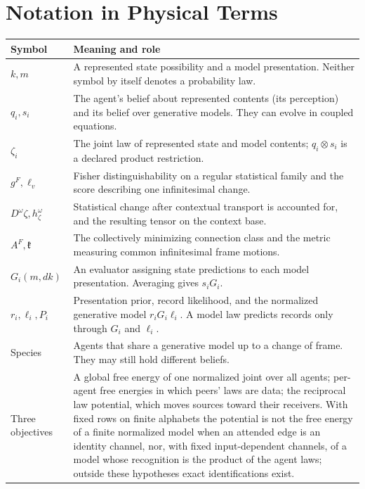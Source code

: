 \chapter{Notation in Physical Terms}
\begingroup
\small{}
\renewcommand{\arraystretch}{1.0}
\begin{longtable}{@{}>{\raggedright\arraybackslash}p{}>{\raggedright\arraybackslash}p{}@{}}
\toprule
Symbol & Meaning and role\\
\midrule\endhead
\bottomrule\endfoot
$k,m$ & A represented state possibility and a model presentation. Neither symbol by itself denotes a probability law.\\
$q_i,s_i$ & The agent's belief about represented contents (its perception) and its belief over generative models. They can evolve in coupled equations.\\
$\zeta_i$ & The joint law of represented state and model contents; $q_i\otimes s_i$ is a declared product restriction.\\
$g^F,\ell_v$ & Fisher distinguishability on a regular statistical family and the score describing one infinitesimal change.\\
$D^\omega\zeta,h^\omega_\zeta$ & Statistical change after contextual transport is accounted for, and the resulting tensor on the context base.\\
$A^F,\mathfrak k$ & The collectively minimizing connection class and the metric measuring common infinitesimal frame motions.\\
$G_i(m,dk)$ & An evaluator assigning state predictions to each model presentation. Averaging gives $s_iG_i$.\\
$r_i,\ell_i,P_i$ & Presentation prior, record likelihood, and the normalized generative model $r_iG_i\ell_i$. A model law predicts records only through $G_i$ and $\ell_i$.\\
Species & Agents that share a generative model up to a change of frame. They may still hold different beliefs.\\
Three objectives & A global free energy of one normalized joint over all agents; per-agent free energies in which peers' laws are data; the reciprocal law potential, which moves sources toward their receivers. With fixed rows on finite alphabets the potential is not the free energy of a finite normalized model when an attended edge is an identity channel, nor, with fixed input-dependent channels, of a model whose recognition is the product of the agent laws; outside these hypotheses exact identifications exist.\\

\end{longtable}
